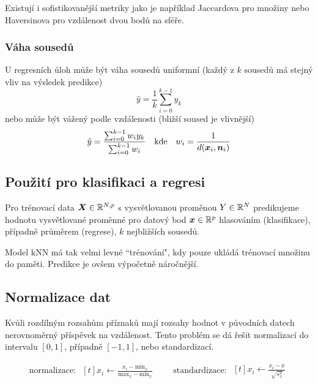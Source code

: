 Existují i sofistikovanější metriky jako je například Jaccardova pro množiny nebo Haversinova pro vzdálenost dvou bodů na sféře.

\subsubsection{Váha sousedů}

U regresních úloh může být váha sousedů uniformní (každý z $k$ sousedů má stejný vliv na výsledek predikce)
\[
    \hat{y} = \frac{1}{k} \sum_{i=0}^{k-1} y_k
\]
nebo může být vážený podle vzdálenosti (bližší soused je vlivnější)
\begin{equation*}
    \begin{aligned}[t]
        \hat{y} = \frac{\sum_{i=0}^{k-1} w_i y_k}{\sum_{i=0}^{k-1} w_i}
    \end{aligned}
    \quad \text{kde} \quad
    \begin{aligned}[t]
        w_i = \frac{1}{d(\bm{x}_i, \bm{n}_i)}
    \end{aligned}
\end{equation*}

\subsection{Použití pro klasifikaci a regresi}

Pro trénovací data $\bm{X} \in \mathbb{R}^{N, p}$ s vysvětlovanou proměnou $Y \in \mathbb{R}^N$ predikujeme hodnotu vysvětlované proměnné pro datový bod $\bm{x} \in \mathbb{R}^p$ hlasováním (klasifikace), případně průměrem (regrese), $k$ nejbližších sousedů.

Model kNN má tak velmi levné ``trénování", kdy pouze ukládá trénovací množinu do paměti. Predikce je ovšem výpočetně náročnější.

\subsection{Normalizace dat}

Kvůli rozdílným rozsahům příznaků mají rozsahy hodnot v původních datech nerovnoměrný příspěvek na vzdálenost. Tento problém se dá řešit normalizací do intervalu $[0,1]$, případně $[-1, 1]$, nebo standardizací.

\begin{equation*}
    \text{normalizace: }
    \begin{aligned}[t]
        x_i \leftarrow \frac{x_i - \text{min}_x}{\text{max}_x - \text{min}_x}
    \end{aligned}
    \quad\quad
    \text{standardizace: }
    \begin{aligned}[t]
        x_i \leftarrow \frac{x_i - \bar{x}}{\sqrt{s_x^2}}
    \end{aligned}
\end{equation*}

